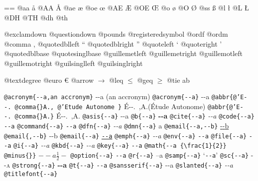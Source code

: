 \documentclass{book}
\makeatletter
\newcommand\GNUTexinfocommandstyletextcite[1]{{\normalfont{}\textsl{#1}}}%
\newenvironment{GNUTexinfopreformatted}{%
  \par\obeylines\obeyspaces\frenchspacing
  \parskip=\z@\parindent=\z@}{}
\makeatother
\begin{document}
\begin{GNUTexinfopreformatted}
@aa \aa{}
@AA \AA{}
@ae \ae{}
@oe \oe{}
@AE \AE{}
@OE \OE{}
@o \o{}
@O \O{}
@ss \ss{}
@l \l{}
@L \L{}
@DH \DH{}
@TH \TH{}
@dh \dh{}
@th \th{}

@exclamdown \textexclamdown{}
@questiondown \textquestiondown{}
@pounds \textsterling{}
@registeredsymbol \circledR{}
@ordf \textordfeminine{}
@ordm \textordmasculine{}
@comma ,
@quotedblleft \textquotedblleft{}
@quotedblright \textquotedblright{}
@quoteleft \textquoteleft{}
@quoteright \textquoteright{}
@quotedblbase \quotedblbase{}
@quotesinglbase \quotesinglbase{}
@guillemetleft \guillemotleft{}
@guillemetright \guillemotright{}
@guillemotleft \guillemotleft{}
@guillemotright \guillemotright{}
@guilsinglleft \guilsinglleft{}
@guilsinglright \guilsinglright{}

@textdegree \textdegree{}
@euro \euro{}
@arrow $\rightarrow{}$
@leq $\leq{}$
@geq $\geq{}$
@tie a\hbox{}b

\texttt{@acronym\{{-}{-}a,an accronym\}} {-}{-}a (an accronym)
\texttt{@acronym\{{-}{-}a\}} {-}{-}a
\texttt{@abbr\{@'E{-}{-}.\ @comma\{\}A.,\ @'Etude Autonome \}} \'{E}{-}{-}.\@\ ,A.\@ (\'{E}tude Autonome)
\texttt{@abbr\{@'E{-}{-}.\ @comma\{\}A.\}} \'{E}{-}{-}.\@\ ,A.\@
\texttt{@asis\{{-}{-}a\}} {-}{-}a
\texttt{@b\{{-}{-}a\}} \textbf{{-}{-}a}
\texttt{@cite\{{-}{-}a\}} \GNUTexinfocommandstyletextcite{{-}{-}a}
\texttt{@code\{{-}{-}a\}} \texttt{{-}{-}a}
\texttt{@command\{{-}{-}a\}} \texttt{{-}{-}a}
\texttt{@dfn\{{-}{-}a\}} \textsl{{-}{-}a}
\texttt{@dmn\{{-}{-}a\}} \thinspace {-}{-}a
\texttt{@email\{{-}{-}a,{-}{-}b\}} \href{mailto:--a}{{-}{-}b}
\texttt{@email\{,{-}{-}b\}} {-}{-}b
\texttt{@email\{{-}{-}a\}} \href{mailto:--a}{\nolinkurl{--a}}
\texttt{@emph\{{-}{-}a\}} \emph{{-}{-}a}
\texttt{@env\{{-}{-}a\}} \texttt{{-}{-}a}
\texttt{@file\{{-}{-}a\}} \texttt{{-}{-}a}
\texttt{@i\{{-}{-}a\}} \textit{{-}{-}a}
\texttt{@kbd\{{-}{-}a\}} {\ttfamily\textsl{{-}{-}a}}
\texttt{@key\{{-}{-}a\}} \texttt{{-}{-}a}
\texttt{@math\{{-}{-}a \{\textbackslash{}frac\{1\}\{2\}\} @minus\{\}\}} $--a {\frac{1}{2}} -$
\texttt{@option\{{-}{-}a\}} \texttt{{-}{-}a}
\texttt{@r\{{-}{-}a\}} \textnormal{--a}
\texttt{@samp\{{-}{-}a\}} `\texttt{{-}{-}a}'
\texttt{@sc\{{-}{-}a\}} \textsc{{-}{-}a}
\texttt{@strong\{{-}{-}a\}} \textbf{{-}{-}a}
\texttt{@t\{{-}{-}a\}} \texttt{{-}{-}a}
\texttt{@sansserif\{{-}{-}a\}} \textsf{{-}{-}a}
\texttt{@slanted\{{-}{-}a\}} \textsl{{-}{-}a}
\texttt{@titlefont\{{-}{-}a\}} \end{GNUTexinfopreformatted}
\end{document}
